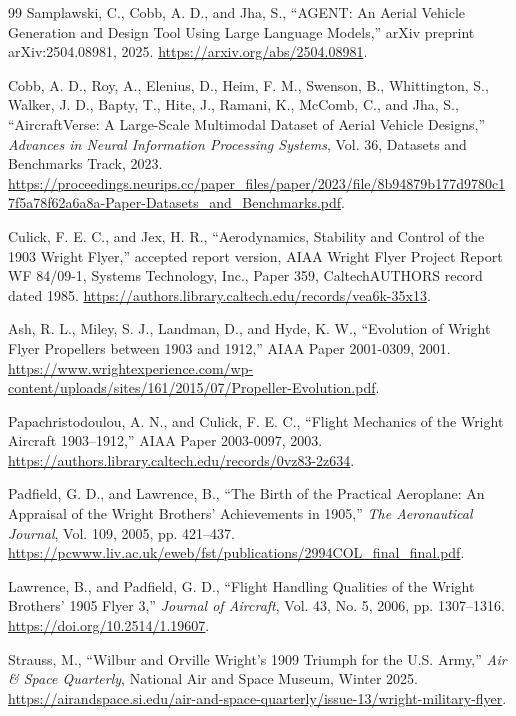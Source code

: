 \documentclass[10pt,letterpaper]{article}
\begin{document}
\begin{thebibliography}{99}
 Samplawski, C., Cobb, A. D., and Jha, S., ``AGENT: An Aerial Vehicle Generation and Design Tool Using Large Language Models,'' arXiv preprint arXiv:2504.08981, 2025. \url{https://arxiv.org/abs/2504.08981}.

 Cobb, A. D., Roy, A., Elenius, D., Heim, F. M., Swenson, B., Whittington, S., Walker, J. D., Bapty, T., Hite, J., Ramani, K., McComb, C., and Jha, S., ``AircraftVerse: A Large-Scale Multimodal Dataset of Aerial Vehicle Designs,'' \emph{Advances in Neural Information Processing Systems}, Vol. 36, Datasets and Benchmarks Track, 2023. \url{https://proceedings.neurips.cc/paper_files/paper/2023/file/8b94879b177d9780c17f5a78f62a6a8a-Paper-Datasets_and_Benchmarks.pdf}.

 Culick, F. E. C., and Jex, H. R., ``Aerodynamics, Stability and Control of the 1903 Wright Flyer,'' accepted report version, AIAA Wright Flyer Project Report WF 84/09-1, Systems Technology, Inc., Paper 359, CaltechAUTHORS record dated 1985. \url{https://authors.library.caltech.edu/records/vea6k-35x13}.

 Ash, R. L., Miley, S. J., Landman, D., and Hyde, K. W., ``Evolution of Wright Flyer Propellers between 1903 and 1912,'' AIAA Paper 2001-0309, 2001. \url{https://www.wrightexperience.com/wp-content/uploads/sites/161/2015/07/Propeller-Evolution.pdf}.

 Papachristodoulou, A. N., and Culick, F. E. C., ``Flight Mechanics of the Wright Aircraft 1903--1912,'' AIAA Paper 2003-0097, 2003. \url{https://authors.library.caltech.edu/records/0vz83-2z634}.

 Padfield, G. D., and Lawrence, B., ``The Birth of the Practical Aeroplane: An Appraisal of the Wright Brothers' Achievements in 1905,'' \emph{The Aeronautical Journal}, Vol. 109, 2005, pp. 421--437. \url{https://pcwww.liv.ac.uk/eweb/fst/publications/2994COL_final_final.pdf}.

 Lawrence, B., and Padfield, G. D., ``Flight Handling Qualities of the Wright Brothers' 1905 Flyer 3,'' \emph{Journal of Aircraft}, Vol. 43, No. 5, 2006, pp. 1307--1316. \url{https://doi.org/10.2514/1.19607}.

 Strauss, M., ``Wilbur and Orville Wright's 1909 Triumph for the U.S. Army,'' \emph{Air \& Space Quarterly}, National Air and Space Museum, Winter 2025. \url{https://airandspace.si.edu/air-and-space-quarterly/issue-13/wright-military-flyer}.


\end{thebibliography}
\end{document}
